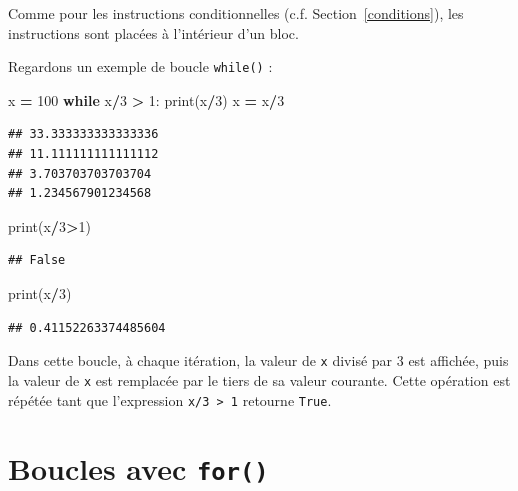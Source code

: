 \documentclass[12pt,]{book}
\newenvironment{Shaded}{\begin{snugshade}}{\end{snugshade}}
\newcommand{\DecValTok}[1]{\textcolor[rgb]{0.00,0.00,0.81}{#1}}
\newcommand{\ControlFlowTok}[1]{\textcolor[rgb]{0.13,0.29,0.53}{\textbf{#1}}}
\newcommand{\OperatorTok}[1]{\textcolor[rgb]{0.81,0.36,0.00}{\textbf{#1}}}
\newcommand{\BuiltInTok}[1]{#1}
\newcommand{\NormalTok}[1]{#1}
\numberwithin{equation}{section}
\numberwithin{countremarque}{section}
\begin{document}
Comme pour les instructions conditionnelles (c.f.
Section~\ref{conditions}), les instructions sont placées à l'intérieur
d'un bloc.

Regardons un exemple de boucle \texttt{while()} :

\begin{Shaded}
\begin{Highlighting}[]
\NormalTok{x }\OperatorTok{=} \DecValTok{100}
\ControlFlowTok{while}\NormalTok{ x}\OperatorTok{/}\DecValTok{3} \OperatorTok{>} \DecValTok{1}\NormalTok{:}
  \BuiltInTok{print}\NormalTok{(x}\OperatorTok{/}\DecValTok{3}\NormalTok{)}
\NormalTok{  x }\OperatorTok{=}\NormalTok{ x}\OperatorTok{/}\DecValTok{3}
\end{Highlighting}
\end{Shaded}

\begin{lstlisting}
## 33.333333333333336
## 11.111111111111112
## 3.703703703703704
## 1.234567901234568
\end{lstlisting}

\begin{Shaded}
\begin{Highlighting}[]
\BuiltInTok{print}\NormalTok{(x}\OperatorTok{/}\DecValTok{3}\OperatorTok{>}\DecValTok{1}\NormalTok{)}
\end{Highlighting}
\end{Shaded}

\begin{lstlisting}
## False
\end{lstlisting}

\begin{Shaded}
\begin{Highlighting}[]
\BuiltInTok{print}\NormalTok{(x}\OperatorTok{/}\DecValTok{3}\NormalTok{)}
\end{Highlighting}
\end{Shaded}

\begin{lstlisting}
## 0.41152263374485604
\end{lstlisting}

Dans cette boucle, à chaque itération, la valeur de \texttt{x} divisé
par 3 est affichée, puis la valeur de \texttt{x} est remplacée par le
tiers de sa valeur courante. Cette opération est répétée tant que
l'expression \texttt{x/3\ \textgreater{}\ 1} retourne \texttt{True}.

\section{\texorpdfstring{Boucles avec
\texttt{for()}}{Boucles avec for()}}\label{boucles-avec-for}
\end{document}
